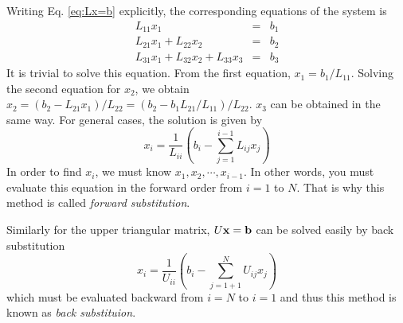 Writing Eq. \eqref{eq:Lx=b} explicitly, the corresponding equations of the system is
\begin{subequations}
\begin{eqnarray}
L_{11} x_1 &=& b_1 \\
L_{21} x_1 + L_{22} x_2 &=& b_2 \\
L_{31} x_1 + L_{32} x_2 + L_{33} x_3 &=& b_3
\end{eqnarray}
\end{subequations}
It is trivial to solve this equation.  From the first equation, $x_1 = b_1/L_{11}$. Solving the second equation for $x_2$, we obtain
$x_2 = (b_2 -L_{21} x_1)/L_{22} = (b_2 - b_1 L_{21}/L_{11}) / L_{22}$. $x_3$ can be obtained in the same way.  For general cases, the solution is given by
\begin{equation}\label{eq:fwd_sb}
x_i=\frac{1}{L_{ii}} \left( b_i - \displaystyle\sum_{j=1}^{i-1} L_{ij} x_j\right )
\end{equation}
In order to find $x_i$, we must know $x_1, x_2, \cdots, x_{i-1}$.  In other words, you must evaluate this equation in the forward order from $i=1$ to $N$. That is why this method is called \emph{forward substitution}.  

Similarly for the upper triangular matrix, $U \vb{x} = \vb{b}$ can be solved easily by back substitution
\begin{equation}\label{eq:bwd_sb}
x_i=\frac{1}{U_{ii}} \left ( b_i - \displaystyle\sum_{j=1+1}^{N} U_{ij} x_j \right )
\end{equation}
which must be evaluated backward from $i=N$ to $i=1$ and thus this method is known as \emph{back substituion}.

